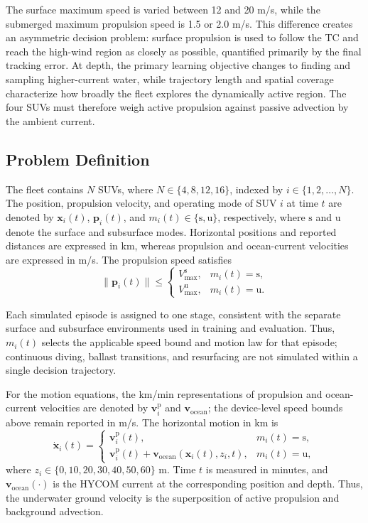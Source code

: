 \documentclass[a4paper,fleqn]{cas-dc}
\begin{document}
The surface maximum speed is varied between 12 and 20 m/s, while the submerged
maximum propulsion speed is 1.5 or 2.0 m/s. This difference creates an
asymmetric decision problem: surface propulsion is used to follow the TC and
reach the high-wind region as closely as possible, quantified primarily by the
final tracking error. At depth, the primary learning objective changes to
finding and sampling higher-current water, while trajectory length and spatial
coverage characterize how broadly the fleet explores the dynamically active
region. The four SUVs must therefore weigh active propulsion against passive
advection by the ambient current.

\subsection{Problem Definition}

The fleet contains $N$ SUVs, where $N\in\{4,8,12,16\}$, indexed by
$i\in\{1,2,\ldots,N\}$. The position, propulsion velocity,
and operating mode of SUV $i$ at time $t$ are denoted by
$\mathbf{x}_i(t)$, $\mathbf{p}_i(t)$, and $m_i(t)\in\{\mathrm{s},\mathrm{u}\}$,
respectively, where $\mathrm{s}$ and $\mathrm{u}$ denote the surface and
subsurface modes. Horizontal positions and reported distances are expressed in
km, whereas propulsion and ocean-current velocities are expressed in m/s. The
propulsion speed satisfies
\begin{equation}
\|\mathbf{p}_i(t)\|\leq
\begin{cases}
V_{\max}^{\mathrm{s}}, & m_i(t)=\mathrm{s},\\
V_{\max}^{\mathrm{u}}, & m_i(t)=\mathrm{u}.
\end{cases}
\label{eq:speed_constraint}
\end{equation}

Each simulated episode is assigned to one stage, consistent with the separate
surface and subsurface environments used in training and evaluation. Thus,
$m_i(t)$ selects the applicable speed bound and motion law for that episode;
continuous diving, ballast transitions, and resurfacing are not simulated
within a single decision trajectory.

For the motion equations, the km/min representations of propulsion and
ocean-current velocities are denoted by \(\mathbf{v}_i^{\mathrm{p}}\) and
\(\mathbf{v}_{\mathrm{ocean}}\); the device-level speed bounds above remain
reported in m/s. The horizontal motion in km is
\begin{equation}
\dot{\mathbf{x}}_i(t)=
\begin{cases}
\mathbf{v}_i^{\mathrm{p}}(t), & m_i(t)=\mathrm{s},\\[1mm]
\mathbf{v}_i^{\mathrm{p}}(t)+
\mathbf{v}_{\mathrm{ocean}}
\left(\mathbf{x}_i(t),z_i,t\right), & m_i(t)=\mathrm{u},
\end{cases}
\label{eq:platform_motion}
\end{equation}
where $z_i\in\{0,10,20,30,40,50,60\}$ m. Time $t$ is measured in minutes, and
$\mathbf{v}_{\mathrm{ocean}}(\cdot)$ is the HYCOM current at the corresponding
position and depth. Thus, the underwater ground velocity is the superposition
of active propulsion and background advection.
\end{document}
